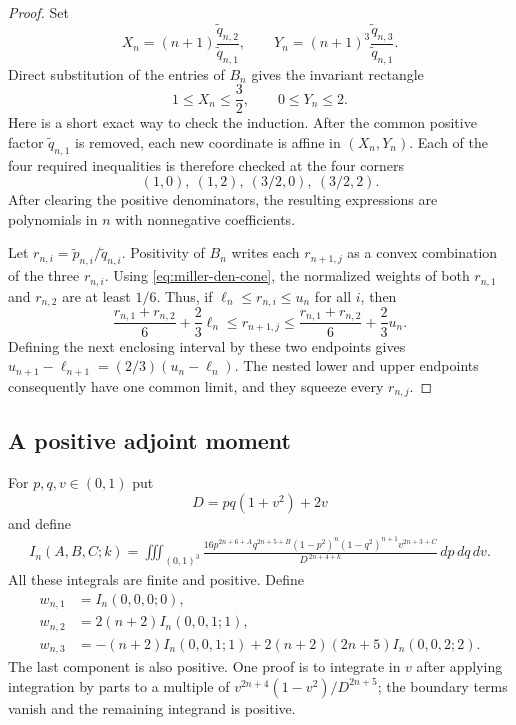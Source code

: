 \begin{proof}
Set
\[
 X_n=(n+1)\frac{\widetilde q_{n,2}}{\widetilde q_{n,1}},
 \qquad
 Y_n=(n+1)^3\frac{\widetilde q_{n,3}}{\widetilde q_{n,1}}.
\]
Direct substitution of the entries of $B_n$ gives the invariant rectangle
\begin{equation}\label{eq:miller-den-cone}
          1\leq X_n\leq\frac32,\qquad 0\leq Y_n\leq2.
\end{equation}
Here is a short exact way to check the induction.  After the common positive
factor $\widetilde q_{n,1}$ is removed, each new coordinate is affine in
$(X_n,Y_n)$.  Each of the four required inequalities is therefore checked at
the four corners
\[
       (1,0),\ (1,2),\ (3/2,0),\ (3/2,2).
\]
After clearing the positive denominators, the resulting expressions are
polynomials in $n$ with nonnegative coefficients.

Let $r_{n,i}=\widetilde p_{n,i}/\widetilde q_{n,i}$.  Positivity of $B_n$
writes each $r_{n+1,j}$ as a convex combination of the three $r_{n,i}$.
Using \eqref{eq:miller-den-cone}, the normalized weights of both
$r_{n,1}$ and $r_{n,2}$ are at least $1/6$.  Thus, if
$\ell_n\leq r_{n,i}\leq u_n$ for all $i$, then
\[
\frac{r_{n,1}+r_{n,2}}6+\frac23\ell_n
 \leq r_{n+1,j}\leq
\frac{r_{n,1}+r_{n,2}}6+\frac23u_n .
\]
Defining the next enclosing interval by these two endpoints gives
$u_{n+1}-\ell_{n+1}=(2/3)(u_n-\ell_n)$.  The nested lower and upper
endpoints consequently have one common limit, and they squeeze every
$r_{n,j}$.
\end{proof}

\subsection{A positive adjoint moment}

For $p,q,v\in(0,1)$ put
\[
       D=pq(1+v^2)+2v
\]
and define
\begin{align}
 I_n(A,B,C;k)
   =\iiint_{(0,1)^3}
   \frac{16p^{2n+6+A}q^{2n+5+B}
      (1-p^2)^n(1-q^2)^{n+1}v^{2n+3+C}}
        {D^{\,2n+4+k}}\,dp\,dq\,dv .        \label{eq:miller-moment}
\end{align}
All these integrals are finite and positive.  Define
\begin{equation}\label{eq:miller-w}
\begin{split}
 w_{n,1}&=I_n(0,0,0;0),\\
 w_{n,2}&=2(n+2)I_n(0,0,1;1),\\
 w_{n,3}&=-(n+2)I_n(0,0,1;1)
       +2(n+2)(2n+5)I_n(0,0,2;2).
\end{split}
\end{equation}
The last component is also positive.  One proof is to integrate in $v$
after applying integration by parts to a multiple of
$v^{2n+4}(1-v^2)/D^{2n+5}$; the boundary terms vanish and the remaining
integrand is positive.

